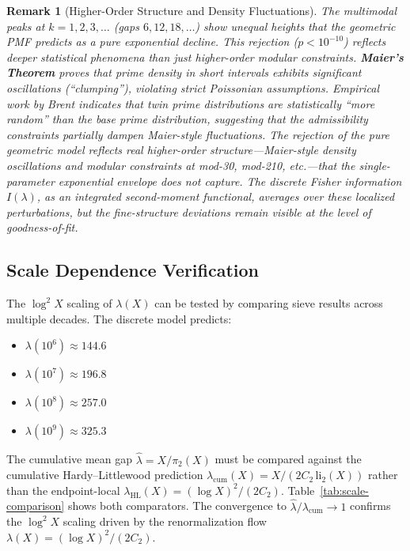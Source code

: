 \documentclass[11pt]{article}
\newtheorem{remark}{Remark}
\begin{document}
\begin{remark}[Higher-Order Structure and Density Fluctuations]
The multimodal peaks at $k = 1, 2, 3, \ldots$ (gaps $6, 12, 18, \ldots$) show unequal heights that the geometric PMF predicts as a pure exponential decline. This rejection ($p < 10^{-10}$) reflects deeper statistical phenomena than just higher-order modular constraints. \textbf{Maier's Theorem} \cite{Mai85} proves that prime density in short intervals exhibits significant oscillations (``clumping''), violating strict Poissonian assumptions. Empirical work by Brent \cite{Bre14} indicates that twin prime distributions are statistically ``more random'' than the base prime distribution, suggesting that the admissibility constraints partially dampen Maier-style fluctuations. The rejection of the pure geometric model reflects real higher-order structure---Maier-style density oscillations and modular constraints at mod-30, mod-210, etc.---that the single-parameter exponential envelope does not capture. The discrete Fisher information $I(\lambda)$, as an integrated second-moment functional, averages over these localized perturbations, but the fine-structure deviations remain visible at the level of goodness-of-fit.
\end{remark}

\subsection{Scale Dependence Verification}
\label{sec:scale-dep}
The $\log^2 X$ scaling of $\lambda(X)$ can be tested by comparing sieve results across multiple decades. The discrete model predicts:
\begin{itemize}
    \item $\lambda(10^6) \approx 144.6$
    \item $\lambda(10^7) \approx 196.8$
    \item $\lambda(10^8) \approx 257.0$
    \item $\lambda(10^9) \approx 325.3$
\end{itemize}
The cumulative mean gap $\hat{\lambda} = X/\pi_2(X)$ must be compared against the cumulative Hardy--Littlewood prediction $\lambda_{\text{cum}}(X) = X/(2C_2\,\mathrm{li}_2(X))$ rather than the endpoint-local $\lambda_{\text{HL}}(X) = (\log X)^2/(2C_2)$. Table~\ref{tab:scale-comparison} shows both comparators. The convergence to $\hat{\lambda}/\lambda_{\text{cum}} \to 1$ confirms the $\log^2 X$ scaling driven by the renormalization flow $\lambda(X) = (\log X)^2/(2C_2)$.
\end{document}
